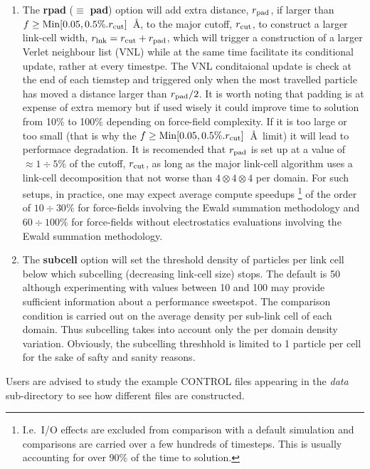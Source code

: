 \begin{enumerate}
\item The {\bf rpad} ($\equiv$ {\bf pad}) option will add extra distance,
$r_{\rm pad}$, if larger than $f \ge {\rm Min}[0.05,0.5\%.r_{\rm cut}]$~\AA,
to the major cutoff, $r_{\rm cut}$, to construct a larger link-cell width,
$r_{\rm lnk}=r_{\rm cut}+r_{\rm pad}$, which will trigger a construction of
a larger Verlet neighbour list (VNL) while at the same time facilitate its
conditional update, rather at every timestpe.  The VNL conditaional update
is check at the end of each tiemstep and triggered only when the most
travelled particle has moved a distance larger than $r_{\rm pad}/2$.  It is
worth noting that padding is at expense of extra memory but if used wisely
it could improve time to solution from 10\% to 100\% depending on force-field
complexity.  If it is too large or too small (that is why the
$f \ge {\rm Min}[0.05,0.5\%.r_{\rm cut}]$~\AA~limit) it will lead to
performace degradation.  It is recomended that $r_{\rm pad}$ is set up at a
value of $\approx 1 \div 5\%$ of the cutoff, $r_{\rm cut}$, as long as the
major link-cell algorithm uses a link-cell decomposition that not worse than
$4 \otimes 4 \otimes 4$ per domain.  For such setups, in practice, one
may expect average compute speedups \footnote{I.e.~I/O effects are excluded
from comparison with a default simulation and comparisons are carried over
a few hundreds of timesteps.  This is usually accounting for over $90\%$ of
the time to solution.} of the order of $10 \div 30\%$ for force-fields
involving the Ewald summation methodology and $60 \div 100\%$ for force-fields
without electrostatics evaluations involving the Ewald summation methodology.

\item The {\bf subcell} option will set the threshold density of particles
per link cell below which subcelling (decreasing link-cell size) stops.  The
default is 50 although experimenting with values between 10 and 100 may
provide sufficient information about a performance sweetspot.  The comparison
condition is carried out on the average density per sub-link cell of each
domain.  Thus subcelling takes into account only the per domain density
variation. Obviously, the subcelling threshhold is limited to 1 particle per
cell for the sake of safty and sanity reasons.
\end{enumerate}

\noindent Users are advised to study the example CONTROL files
appearing in the {\em data} sub-directory to see how different
files are constructed.

